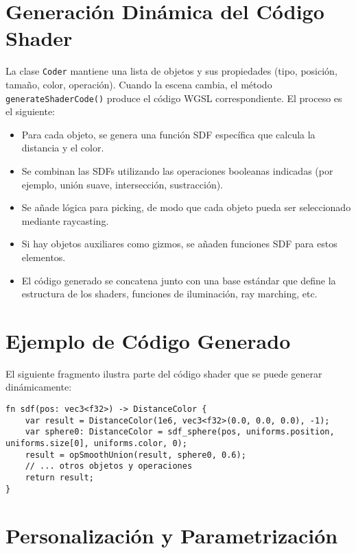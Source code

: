 \section{Generación Dinámica del Código Shader}

La clase \texttt{Coder} mantiene una lista de objetos y sus propiedades (tipo,
posición, tamaño, color, operación). Cuando la escena cambia, el método
\texttt{generateShaderCode()} produce el código WGSL correspondiente. El
proceso es el siguiente:

\begin{itemize}
    \item Para cada objeto, se genera una función SDF específica que calcula la distancia
          y el color.
    \item Se combinan las SDFs utilizando las operaciones booleanas indicadas (por
          ejemplo, unión suave, intersección, sustracción).
    \item Se añade lógica para picking, de modo que cada objeto pueda ser seleccionado
          mediante raycasting.
    \item Si hay objetos auxiliares como gizmos, se añaden funciones SDF para estos
          elementos.
    \item El código generado se concatena junto con una base estándar que define la
          estructura de los shaders, funciones de iluminación, ray marching, etc.
\end{itemize}

\section{Ejemplo de Código Generado}

El siguiente fragmento ilustra parte del código shader que se puede generar
dinámicamente:

\begin{lstlisting}[language=WGSL, caption={Fragmento de código WGSL generado}]
fn sdf(pos: vec3<f32>) -> DistanceColor {
    var result = DistanceColor(1e6, vec3<f32>(0.0, 0.0, 0.0), -1);
    var sphere0: DistanceColor = sdf_sphere(pos, uniforms.position, uniforms.size[0], uniforms.color, 0);
    result = opSmoothUnion(result, sphere0, 0.6);
    // ... otros objetos y operaciones
    return result;
}
\end{lstlisting}

\section{Personalización y Parametrización}

